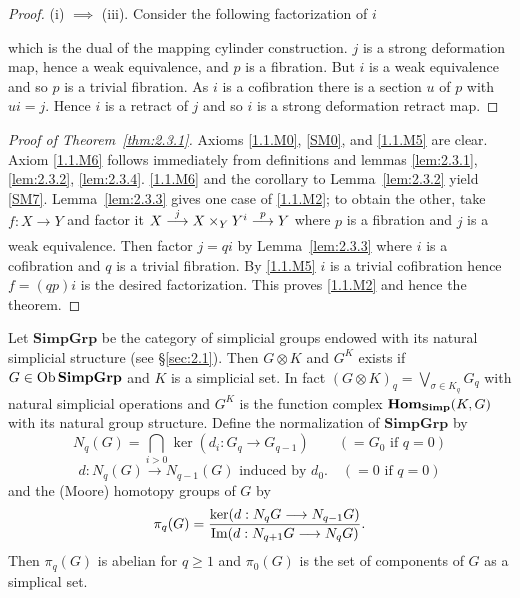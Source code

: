 \documentclass[../main]{subfiles}
\begin{document}
\begin{proof}
(i) $\implies$ (iii). Consider the following factorization of $i$
\begin{center}
\end{center} 
which is the dual of the mapping cylinder construction. $j$ is a strong deformation map, hence a weak equivalence, and $p$ is a fibration. But $i$ is a weak equivalence and so $p$ is a trivial fibration. As $i$ is a cofibration there is a section $u$ of $p$ with $ui = j$. Hence $i$ is a retract of $j$ and so $i$ is a strong deformation retract map. 
\end{proof} 

\begin{proof}[Proof of Theorem~\ref{thm:2.3.1}]
Axioms \ref{1.1.M0}, \ref{SM0}, and \ref{1.1.M5} are clear. Axiom \ref{1.1.M6} follows immediately from definitions and lemmas \ref{lem:2.3.1}, \ref{lem:2.3.2}, \ref{lem:2.3.4}. \ref{1.1.M6} and the corollary to Lemma~\ref{lem:2.3.2} yield \ref{SM7}. Lemma~\ref{lem:2.3.3} gives one case of \ref{1.1.M2}; to obtain the other, take $f \colon X \to Y$ and factor it $X \varrightarrow{j} X \times_Y Y^i \varrightarrow{p} Y$ where $p$ is a fibration and $j$ is a weak equivalence. Then factor $j = qi$ by Lemma~\ref{lem:2.3.3} where $i$ is a cofibration and $q$ is a trivial fibration. By \ref{1.1.M5} $i$ is a trivial cofibration hence $f = (qp)i$ is the desired factorization. This proves \ref{1.1.M2} and hence the theorem. 
\end{proof} 
Let \(\mathbf{Simp Grp}\) be the category of simplicial groups endowed with its natural simplicial structure (see \S\ref{sec:2.1}). Then \(G\otimes K\) and \(G^K\) exists if \(G\in \operatorname{Ob} \mathbf{Simp Grp}\) and \(K\) is a simplicial set. In fact $(G\otimes K)_q = \bigvee_{\sigma\in K_q} G_q$ with natural simplicial operations and $G^K$ is the function complex $\operatorname{\mathbf{Hom}}_{\mathbf{Simp}}(K,G)$ with its natural group structure. Define the normalization of $\mathbf{Simp Grp}$ by
\[N_q(G) = \bigcap_{i>0}\ker(d_i:G_q\longrightarrow G_{q-1})\quad \quad (=G_0\text{   if   } q=0)\]
\[d:N_q(G)\longrightarrow N_{q-1}(G)\text{   induced by  } d_0.\quad (=0\text{   if   } q=0)\]
and the (Moore) homotopy groups of $G$ by
    \[\pi_{q}(G) = \frac{\ker(d : N_{q}G \longrightarrow N_{q-1}G)}{\operatorname{Im}(d : N_{q+1}G \longrightarrow N_{q}G)}.\]
Then $\pi_{q}(G)$ is abelian for $q \geq 1$ and $\pi_{0}(G)$ is the set of components of $G$ as a simplical set. 
\end{document}
